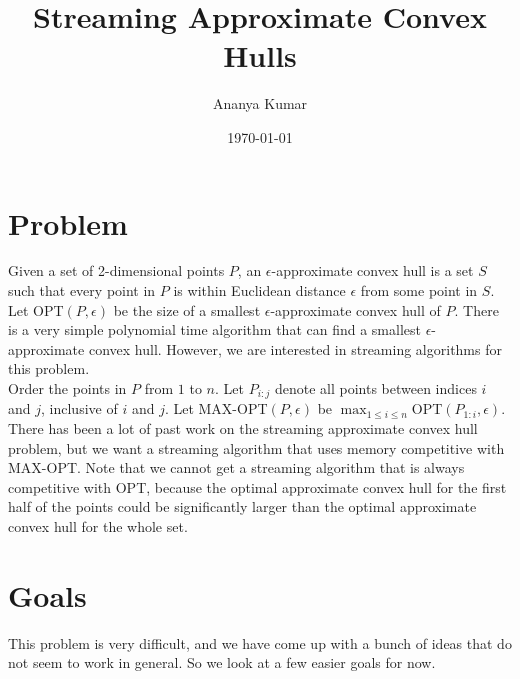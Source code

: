 \documentclass[12pt]{article}
\theoremstyle{definition}
\begin{document}
\title{Streaming Approximate Convex Hulls}         %
\author{Ananya Kumar}        %
\date{\today}          %
\maketitle

\section{Problem}

Given a set of 2-dimensional points $P$, an $\epsilon$-approximate convex hull is a set $S$ such that every point in $P$ is within Euclidean distance $\epsilon$ from some point in $S$. Let OPT$(P, \epsilon)$ be the size of a smallest $\epsilon$-approximate convex hull of $P$. There is a very simple polynomial time algorithm that can find a smallest $\epsilon$-approximate convex hull. However, we are interested in streaming algorithms for this problem.
\\

\noindent Order the points in $P$ from $1$ to $n$. Let $P_{i:j}$ denote all points between indices $i$ and $j$, inclusive of $i$ and $j$. Let MAX-OPT$(P, \epsilon)$ be $\max_{1 \leq i \leq n} $OPT$(P_{1:i}, \epsilon)$. There has been a lot of past work on the streaming approximate convex hull problem, but we want a streaming algorithm that uses memory competitive with MAX-OPT. Note that we cannot get a streaming algorithm that is always competitive with OPT, because the optimal approximate convex hull for the first half of the points could be significantly larger than the optimal approximate convex hull for the whole set. 

\section{Goals}

This problem is very difficult, and we have come up with a bunch of ideas that do not seem to work in general. So we look at a few easier goals for now.
\end{document}
